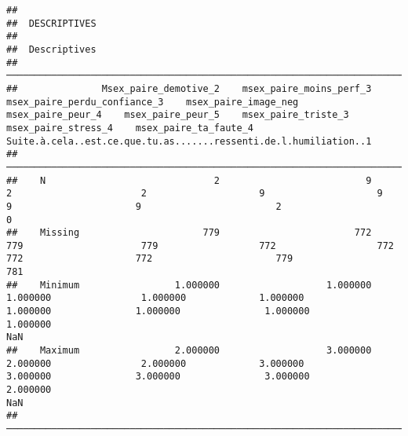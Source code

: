 \documentclass[
]{article}
\begin{document}
\begin{verbatim}
## 
##  DESCRIPTIVES
## 
##  Descriptives                                                                                                                                                                                                                                                                                                  
##  ───────────────────────────────────────────────────────────────────────────────────────────────────────────────────────────────────────────────────────────────────────────────────────────────────────────────────────────────────────────────────────────────────────────────────────────────────────────── 
##               Msex_paire_demotive_2    msex_paire_moins_perf_3    msex_paire_perdu_confiance_3    msex_paire_image_neg    msex_paire_peur_4    msex_paire_peur_5    msex_paire_triste_3    msex_paire_stress_4    msex_paire_ta_faute_4    Suite.à.cela..est.ce.que.tu.as.......ressenti.de.l.humiliation..1   
##  ───────────────────────────────────────────────────────────────────────────────────────────────────────────────────────────────────────────────────────────────────────────────────────────────────────────────────────────────────────────────────────────────────────────────────────────────────────────── 
##    N                              2                          9                               2                       2                    9                    9                      9                      9                        2                                                                    0   
##    Missing                      779                        772                             779                     779                  772                  772                    772                    772                      779                                                                  781   
##    Minimum                 1.000000                   1.000000                        1.000000                1.000000             1.000000             1.000000               1.000000               1.000000                 1.000000                                                                  NaN   
##    Maximum                 2.000000                   3.000000                        2.000000                2.000000             3.000000             3.000000               3.000000               3.000000                 2.000000                                                                  NaN   
##  ─────────────────────────────────────────────────────────────────────────────────────────────────────────────────────────────────────────────────────────────────────────────────────────────────────────────────────────────────────────────────────────────────────────────────────────────────────────────
\end{verbatim}
\end{document}
